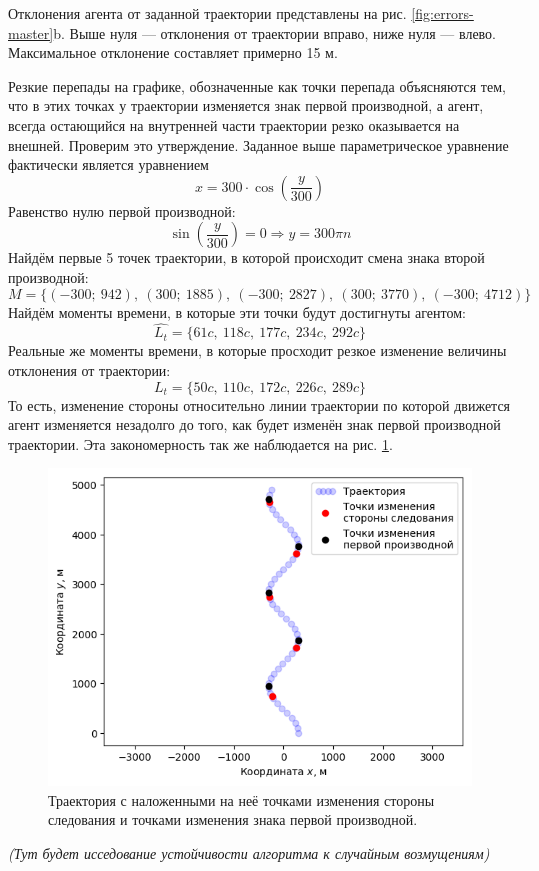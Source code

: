 \documentclass[12pt,a4paper]{article}
\begin{document}
Отклонения агента от заданной траектории представлены на рис. \ref{fig:errors-master}b. Выше нуля — отклонения от траектории вправо, ниже нуля — влево. Максимальное отклонение составляет примерно 15 м. \par
Резкие перепады на графике, обозначенные как точки перепада объясняются тем, что в этих точках у траектории изменяется знак первой производной, а агент, всегда остающийся на внутренней части траектории резко оказывается на внешней. Проверим это утверждение. Заданное выше параметрическое уравнение фактически является уравнением $$x = 300 \cdot \cos(\frac{y}{300})$$
Равенство нулю первой производной:
$$\sin(\frac{y}{300}) = 0 \Rightarrow y = 300 \pi n$$
Найдём первые 5 точек траектории, в которой происходит смена знака второй производной: $$M = \Big\{(-300; \ 942), \ (300; \ 1885), \ (-300; \ 2827), \ (300; \ 3770), \ (-300; \ 4712)\Big\}$$
Найдём моменты времени, в которые эти точки будут достигнуты агентом:
$$\hat{L_t} = \Big\{ 61c, \ 118c, \ 177c, \ 234c, \ 292c \Big\}$$
Реальные же моменты времени, в которые просходит резкое изменение величины отклонения от траектории:
$${L_t} = \Big\{ 50c, \ 110c, \ 172c, \ 226c, \ 289c \Big\}$$
То есть, изменение стороны относительно линии траектории по которой движется агент изменяется незадолго до того, как будет изменён знак первой производной траектории. Эта закономерность так же наблюдается на рис. \ref{fig:master-trajectory-changes-2}. \par
\begin{figure}[!htbp]
	\centering
	\includegraphics[width=0.5\linewidth]{master-trajectory-changes-2}
	\caption{Траектория с наложенными на неё точками изменения стороны следования и точками изменения знака первой производной.}
	\label{fig:master-trajectory-changes-2}
\end{figure}

\begin{center}{\textit{ (Тут будет исседование устойчивости алгоритма к случайным возмущениям)}}
\end{center}
\end{document}
